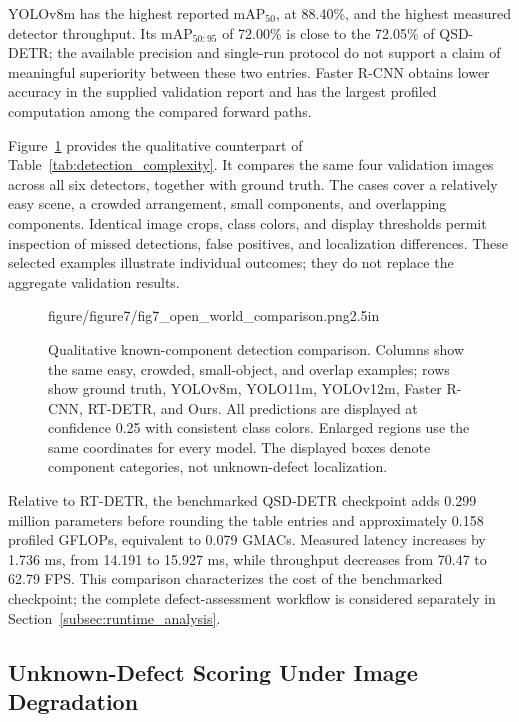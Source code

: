 YOLOv8m has the highest reported mAP$_{50}$, at 88.40\%, and the highest
measured detector throughput. Its mAP$_{50:95}$ of 72.00\% is close to the
72.05\% of QSD-DETR; the available precision and single-run protocol do not
support a claim of meaningful superiority between these two entries.
Faster R-CNN obtains lower accuracy in the supplied validation report and
has the largest profiled computation among the compared forward paths.

Figure~\ref{fig:detection_visualization} provides the qualitative
counterpart of Table~\ref{tab:detection_complexity}. It compares the same
four validation images across all six detectors, together with ground truth.
The cases cover a relatively easy scene, a crowded arrangement, small
components, and overlapping components. Identical image crops, class colors,
and display thresholds permit inspection of missed detections, false
positives, and localization differences. These selected examples illustrate
individual outcomes; they do not replace the aggregate validation results.

\begin{figure}[!t]
  \centering
    {figure/figure7/fig7_open_world_comparison.png}{2.5in}
  \caption{Qualitative known-component detection comparison. Columns show
  the same easy, crowded, small-object, and overlap examples; rows show
  ground truth, YOLOv8m, YOLO11m, YOLOv12m, Faster R-CNN, RT-DETR, and Ours.
  All predictions are displayed at confidence 0.25 with consistent class
  colors. Enlarged regions use the same coordinates for every model.
  The displayed boxes denote component categories, not unknown-defect
  localization.}
  \label{fig:detection_visualization}
\end{figure}

Relative to RT-DETR, the benchmarked QSD-DETR checkpoint adds 0.299 million
parameters before rounding the table entries and approximately 0.158 profiled
GFLOPs, equivalent to 0.079 GMACs. Measured latency increases by 1.736 ms,
from 14.191 to 15.927 ms, while throughput decreases from 70.47 to 62.79 FPS.
This comparison characterizes the cost of the benchmarked checkpoint; the
complete defect-assessment workflow is considered separately in
Section~\ref{subsec:runtime_analysis}.

\subsection{Unknown-Defect Scoring Under Image Degradation}
\label{subsec:unknown_scoring}

